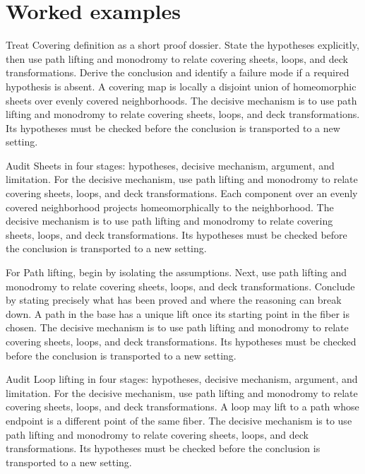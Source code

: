 \section{Worked examples}

\begin{example}\label{ex:iv23-worked-01}
Treat Covering definition as a short proof dossier. State the hypotheses explicitly, then use path lifting and monodromy to relate covering sheets, loops, and deck transformations. Derive the conclusion and identify a failure mode if a required hypothesis is absent. A covering map is locally a disjoint union of homeomorphic sheets over evenly covered neighborhoods. The decisive mechanism is to use path lifting and monodromy to relate covering sheets, loops, and deck transformations. Its hypotheses must be checked before the conclusion is transported to a new setting.
\end{example}

\begin{example}\label{ex:iv23-worked-02}
Audit Sheets in four stages: hypotheses, decisive mechanism, argument, and limitation. For the decisive mechanism, use path lifting and monodromy to relate covering sheets, loops, and deck transformations. Each component over an evenly covered neighborhood projects homeomorphically to the neighborhood. The decisive mechanism is to use path lifting and monodromy to relate covering sheets, loops, and deck transformations. Its hypotheses must be checked before the conclusion is transported to a new setting.
\end{example}

\begin{example}\label{ex:iv23-worked-03}
For Path lifting, begin by isolating the assumptions. Next, use path lifting and monodromy to relate covering sheets, loops, and deck transformations. Conclude by stating precisely what has been proved and where the reasoning can break down. A path in the base has a unique lift once its starting point in the fiber is chosen. The decisive mechanism is to use path lifting and monodromy to relate covering sheets, loops, and deck transformations. Its hypotheses must be checked before the conclusion is transported to a new setting.
\end{example}

\begin{example}\label{ex:iv23-worked-04}
Audit Loop lifting in four stages: hypotheses, decisive mechanism, argument, and limitation. For the decisive mechanism, use path lifting and monodromy to relate covering sheets, loops, and deck transformations. A loop may lift to a path whose endpoint is a different point of the same fiber. The decisive mechanism is to use path lifting and monodromy to relate covering sheets, loops, and deck transformations. Its hypotheses must be checked before the conclusion is transported to a new setting.
\end{example}


